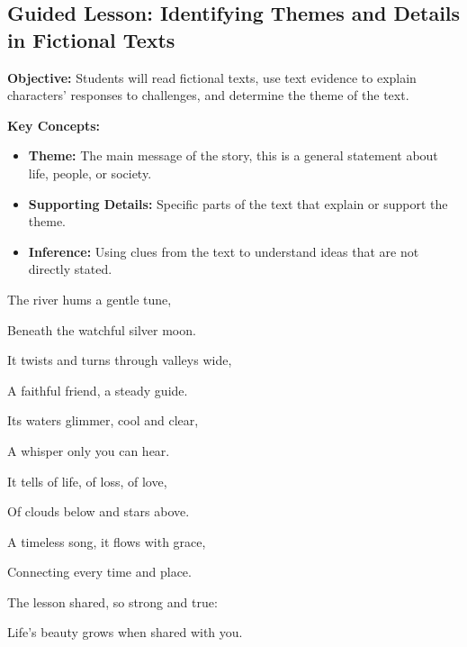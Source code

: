 \documentclass[12pt]{article}
\begin{document}
\subsection*{Guided Lesson: Identifying Themes and Details in Fictional Texts}
\onehalfspacing

\begin{tcolorbox}[colframe=black!40, colback=gray!5, 
coltitle=black, colbacktitle=black!20, fonttitle=\bfseries\Large, 
title=Learning Objective, halign title=center, left=5pt, right=5pt, top=5pt, bottom=15pt]
\textbf{Objective:} Students will read fictional texts, use text evidence to explain characters’ responses to challenges, and determine the theme of the text.
\end{tcolorbox}

\vspace{1em}

\begin{tcolorbox}[colframe=black!60, colback=white, 
coltitle=black, colbacktitle=black!15, fonttitle=\bfseries\Large, 
title=Key Concepts and Vocabulary, halign title=center, left=10pt, right=10pt, top=10pt, bottom=15pt]
\textbf{Key Concepts:}
\begin{itemize}
    \item \textbf{Theme:} The main message of the story, this is a general statement about life, people, or society.
    \item \textbf{Supporting Details:} Specific parts of the text that explain or support the theme.
    \item \textbf{Inference:} Using clues from the text to understand ideas that are not directly stated.
\end{itemize}
\end{tcolorbox}

\vspace{1em}

\begin{tcolorbox}[colframe=black!60, colback=white, 
coltitle=black, colbacktitle=black!15, fonttitle=\bfseries\Large, 
title=\textit{The River’s Song}, halign title=center, left=10pt, right=10pt, top=10pt, bottom=15pt]

The river hums a gentle tune,  


Beneath the watchful silver moon.  


It twists and turns through valleys wide,  


A faithful friend, a steady guide.  



Its waters glimmer, cool and clear,  


A whisper only you can hear.  


It tells of life, of loss, of love,  


Of clouds below and stars above.  


A timeless song, it flows with grace,  


Connecting every time and place.  


The lesson shared, so strong and true:  


Life’s beauty grows when shared with you.

\end{tcolorbox}
\end{document}
